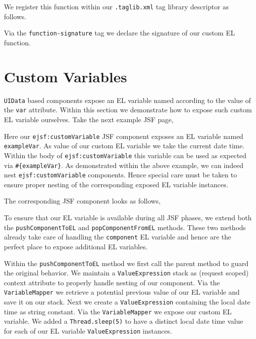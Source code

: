 We register this function within our \texttt{.taglib.xml} tag library descriptor as follows.

Via the \texttt{function-signature} tag we declare the signature of our custom EL function.

\section{Custom Variables}
\texttt{UIData} based components expose an EL variable named according to the value of the \texttt{var} attribute.
Within this section we demonstrate how to expose such custom EL variable ourselves.
Take the next example JSF page,

Here our \texttt{ejsf:customVariable} JSF component exposes an EL variable named \texttt{example\allowbreak Var}.
As value of our custom EL variable we take the current date time.
Within the body of \texttt{ejsf:custom\allowbreak Variable} this variable can be used as expected via \texttt{\#\{exampleVar\}}.
As demonstrated within the above example, we can indeed nest \texttt{ejsf:customVariable} components.
Hence special care must be taken to ensure proper nesting of the corresponding exposed EL variable instances.

The corresponding JSF component looks as follows,

To ensure that our EL variable is available during all JSF phases, we extend both the \texttt{pushComponentToEL} and \texttt{popComponentFromEL} methods.
These two methods already take care of handling the \texttt{component} EL variable and hence are the perfect place to expose additional EL variables.

Within the \texttt{pushComponentToEL} method we first call the parent method to guard the original behavior.
We maintain a \texttt{ValueExpression} stack as (request scoped) context attribute to properly handle nesting of our component.
Via the \texttt{VariableMapper} we retrieve a potential previous value of our EL variable and save it on our stack.
Next we create a \texttt{ValueExpression} containing the local date time as string constant.
Via the \texttt{VariableMapper} we expose our custom EL variable.
We added a \texttt{Thread.sleep(5)} to have a distinct local date time value for each of our EL variable \texttt{ValueExpression} instances.

